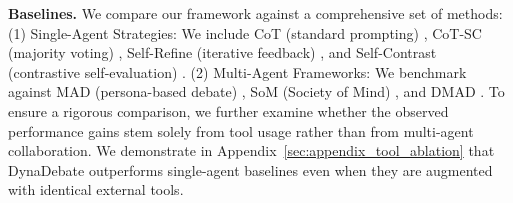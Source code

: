 \noindent\textbf{Baselines.} We compare our framework against a comprehensive set of methods:
(1) Single-Agent Strategies: We include CoT (standard prompting) \cite{wei2022chain}, CoT-SC (majority voting) \cite{wang2022self}, Self-Refine (iterative feedback) \cite{madaan2023self}, and Self-Contrast (contrastive self-evaluation) \cite{selfcontrast2024}. %
(2) Multi-Agent Frameworks: We benchmark against MAD (persona-based debate) \cite{liang2023encouraging}, SoM (Society of Mind) \cite{du2023improving}, and DMAD \cite{liu2025breaking}.
To ensure a rigorous comparison, we further examine whether the observed performance gains stem solely from tool usage rather than from multi-agent collaboration. We demonstrate in Appendix~\ref{sec:appendix_tool_ablation} that DynaDebate outperforms single-agent baselines even when they are augmented with identical external tools.

